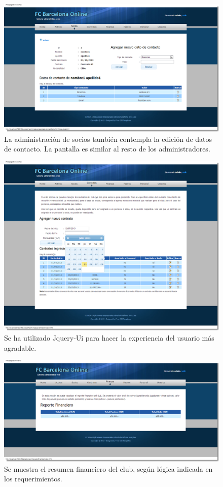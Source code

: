 \documentclass[letter]{article}
\begin{document}
\begin{figure}
\centering
  \includegraphics[width=\textwidth]{figs/fig5.png}
  \caption{La administración de socios también contempla la edición de datos de contacto. La pantalla es similar al resto de los administradores.}
\end{figure}

\begin{figure}
\centering
  \includegraphics[width=\textwidth]{figs/fig6.png}
  \caption{Se ha utilizado Jquery-Ui para hacer la experiencia del usuario más agradable.}
\end{figure}

\begin{figure}
\centering
  \includegraphics[width=\textwidth]{figs/fig7.png}
  \caption{Se muestra el resumen financiero del club, según lógica indicada en los requerimientos.}
\end{figure}
\end{document}
